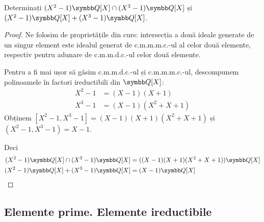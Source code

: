 \begin{exercise}[1.22]
Determinați \((X^2 - 1) \rationals[X] \cap (X^3 - 1) \rationals[X]\) și \((X^2 - 1) \rationals[X] + (X^3 - 1) \rationals[X]\).
\end{exercise}
\begin{proof}
Ne folosim de proprietățile din curs: intersecția a două ideale generate de un singur element este idealul generat de c.m.m.m.c.-ul al celor două elemente, respectiv pentru adunare de c.m.m.d.c.-ul celor două elemente.

Pentru a fi mai ușor să găsim c.m.m.d.c.-ul și c.m.m.m.c.-ul, descompunem polinoamele în factori ireductibili din \(\rationals[X]\):
\begin{align*}
    X^2 - 1 &= (X - 1)(X + 1) \\
    X^3 - 1 &= (X - 1)(X^2 + X + 1)
\end{align*}
Obținem \([X^2 - 1, X^3 - 1] = (X - 1)(X + 1)(X^2 + X + 1)\) și \((X^2 - 1, X^3 - 1) = X - 1\).

Deci
\begin{align*}
    (X^2 - 1) \rationals[X] \cap (X^3 - 1) \rationals[X] &= ((X - 1)(X + 1)(X^2 + X + 1)) \rationals[X] \\
    (X^2 - 1) \rationals[X] + (X^3 - 1) \rationals[X] &= (X - 1) \rationals[X]
\end{align*}
\end{proof}

\subsection{Elemente prime. Elemente ireductibile}

